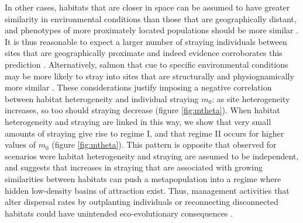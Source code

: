 \documentclass{revtex4}
\begin{document}
In other cases, habitats that are closer in space can be assumed to have greater similarity in environmental conditions than those that are geographically distant, and phenotypes of more proximately located populations should be more similar \citep{Reisenbichler:1988ex,Fraser:2011co,Westley:2012ui}.
It is thus reasonable to expect a larger number of straying individuals between sites that are geographically proximate and indeed evidence corroborates this prediction \citep{Candy:2000hu,JPE:JPE1383}.
Alternatively, salmon that cue to specific environmental conditions may be more likely to stray into sites that are structurally and physiognamically more similar \citep{Peterson:2014gy}.
These considerations justify imposing a negative correlation between habitat heterogeneity and individual straying $m_0$: as site heterogeneity increases, so too should straying decrease (figure \ref{fig:mtheta}).
When habitat heterogeneity and straying are linked in this way, we show that very small amounts of straying give rise to regime I, and that regime II occurs for higher values of $m_0$ (figure \ref{fig:mtheta}).
This pattern is opposite that observed for scenarios were habitat heterogeneity and straying are assumed to be independent, and suggests that increases in straying that are associated with growing similarities between habitats can push a metapopulation into a regime where hidden low-density basins of attraction exist.
Thus, management activities that alter dispersal rates by outplanting individuals or reconnecting disconnected habitats could have unintended eco-evolutionary consequences \citep{Anderson:2013bf,Pess:2014isa}.
\end{document}
